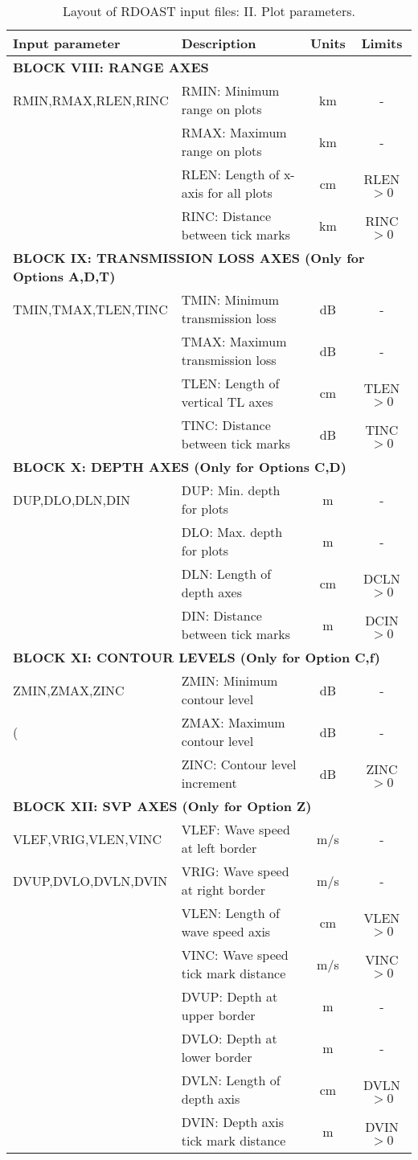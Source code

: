 \begin{table}
\begin{center}
\small
\begin{tabular}{|l|l|c|c|}
\hline \hline
Input parameter & Description & Units & Limits \\
\hline \hline
\multicolumn{4}{|l|}{\bf BLOCK VIII: RANGE AXES} \\
\hline
RMIN,RMAX,RLEN,RINC & RMIN: Minimum range on plots & km & - \\
	& RMAX: Maximum range on plots & km & - \\
	& RLEN: Length of x-axis for all plots & cm & RLEN$>0$ \\
	& RINC: Distance between tick marks & km & RINC$>0$ \\
\hline
\multicolumn{4}{|l|}{\bf BLOCK IX: TRANSMISSION LOSS AXES (Only for
Options A,D,T) } \\
\hline
TMIN,TMAX,TLEN,TINC & TMIN: Minimum transmission loss & dB & - \\
 & TMAX: Maximum transmission loss & dB & - \\
	& TLEN: Length of vertical TL axes & cm & TLEN$>0$ \\
	& TINC: Distance between tick marks & dB & TINC$>0$ \\
\hline
\multicolumn{4}{|l|}{\bf BLOCK X: DEPTH AXES (Only for Options C,D)} \\
\hline
DUP,DLO,DLN,DIN & DUP: Min. depth for plots & m & - \\
         & DLO: Max. depth for plots & m & - \\
	 & DLN: Length of depth axes & cm & DCLN$>0$ \\
	& DIN: Distance between tick marks & m & DCIN$>0$ \\
\hline
\multicolumn{4}{|l|}{\bf BLOCK XI: CONTOUR LEVELS (Only for Option C,f)} \\
\hline
ZMIN,ZMAX,ZINC & ZMIN: Minimum contour level & dB & - \\
(	& ZMAX: Maximum contour level & dB & - \\
	& ZINC: Contour level increment & dB & ZINC$>0$ \\
\hline
\multicolumn{4}{|l|}{\bf BLOCK XII: SVP AXES (Only for Option Z)} \\
\hline
VLEF,VRIG,VLEN,VINC & VLEF: Wave speed at left border & m/s & - \\
DVUP,DVLO,DVLN,DVIN & VRIG: Wave speed at right border & m/s & - \\
                & VLEN: Length of wave speed axis & cm & VLEN$>0$ \\
		& VINC: Wave speed tick mark distance & m/s & VINC$>0$ \\
		& DVUP: Depth at upper border  & m & - \\
		& DVLO: Depth at lower border  & m & - \\
		& DVLN: Length of depth axis   & cm & DVLN$>0$ \\
		& DVIN: Depth axis tick mark distance & m & DVIN$>0$ \\
\hline
\end{tabular}
\end{center}
\caption{Layout of RDOAST input files: II. Plot parameters.
	\label{tab:rdoast-II} }
\end{table} 
